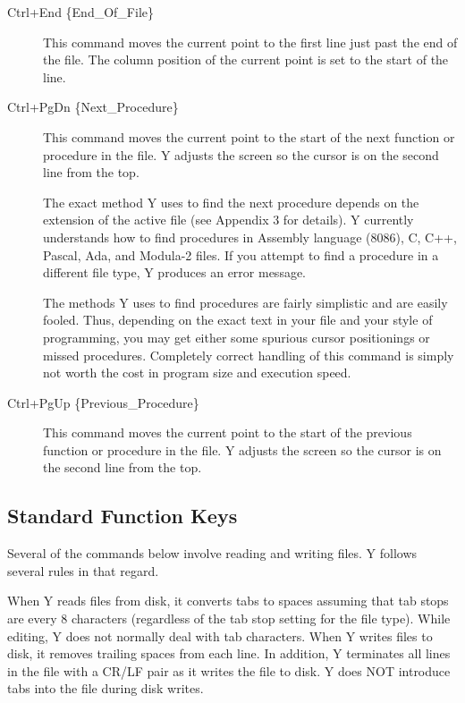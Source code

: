 \begin{description}
\item[Ctrl+End \{End\_Of\_File\}] This command moves the current point to the first line just
  past the end of the file. The column position of the current point is set to the start of the
  line.

\item[Ctrl+PgDn \{Next\_Procedure\}] This command moves the current point to the start of the
  next function or procedure in the file. Y adjusts the screen so the cursor is on the second
  line from the top.

  The exact method Y uses to find the next procedure depends on the extension of the active file
  (see Appendix 3 for details). Y currently understands how to find procedures in Assembly
  language (8086), C, C++, Pascal, Ada, and Modula-2 files. If you attempt to find a procedure
  in a different file type, Y produces an error message.

  The methods Y uses to find procedures are fairly simplistic and are easily fooled. Thus,
  depending on the exact text in your file and your style of programming, you may get either
  some spurious cursor positionings or missed procedures. Completely correct handling of this
  command is simply not worth the cost in program size and execution speed.

\item[Ctrl+PgUp \{Previous\_Procedure\}] This command moves the current point to the start of
  the previous function or procedure in the file. Y adjusts the screen so the cursor is on the
  second line from the top.

\end{description}

\subsection{Standard Function Keys}

Several of the commands below involve reading and writing files. Y follows several rules in that
regard.

When Y reads files from disk, it converts tabs to spaces assuming that tab stops are every 8
characters (regardless of the tab stop setting for the file type). While editing, Y does not
normally deal with tab characters. When Y writes files to disk, it removes trailing spaces from
each line. In addition, Y terminates all lines in the file with a CR/LF pair as it writes the
file to disk. Y does NOT introduce tabs into the file during disk writes.

